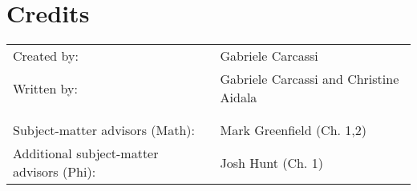 \documentclass[11pt,letterpaper,fleqn]{memoir} %
\begin{document}
\chapter[Credits]{\centering Credits}

\begin{table}[h]
\centering
\begin{tabular}{R{0.45\textwidth} L{0.5\textwidth}}
Created by: & Gabriele Carcassi \\
Written by: & Gabriele Carcassi and Christine Aidala \\
& \\
& \\
Subject-matter advisors (Math): & Mark Greenfield (Ch. 1,2) \\
Additional subject-matter advisors (Phi): & Josh Hunt (Ch. 1) \\




\end{tabular} 
\end{table}


	
\end{document}
